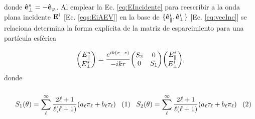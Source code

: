 \documentclass[letterpaper,11pt] {article}
\newcommand{\beqhalf}{\noindent \begin{minipage}[c]{.5\linewidth} \begin{equation}}
\newcommand{\eeqhalf}{\end{equation} \end{minipage} }
\newcommand{\eqhalf}[1]{\beqhalf #1 \eeqhalf}
\begin{document}
donde $\vu{e}_\perp^s=-\vu{e}_\varphi$. Al emplear la Ec. \eqref{eq:EIncidente} para reescribir a la onda plana incidente $\vb{E}^i$ [Ec. \eqref{eqs:EiAEV}] en la base de $\{\vu{e}_\parallel^i,\vu{e}_\perp^i\}$ [Ec. \eqref{eq:vecInc}] se relaciona determina la forma explícita de la matriz de esparcimiento para una partícula esférica\vspace*{-.5em}
	\begin{tcolorbox}[title = Matriz de esparcimiento de Mie,  breakable ]
	\begin{equation}
	\mqty(E_{\parallel}^s\\E_{\perp}^s)  =  
		\frac{e^{ik(r-z)}}{-ikr} \mqty(S_2 & 0\\ 0 & S_1)
	\mqty(E_{\parallel}^i\\E_{\perp}^i),	
	\end{equation}
	donde \begin{subequations}\\
	\eqhalf{	S_1 (\theta) = \sum_\ell^\infty\frac{2\ell+1}{\ell(\ell+1)}(a_\ell\pi_\ell+b_\ell\tau_\ell)
				\label{eqs:S_1}}
	\eqhalf{	S_2 (\theta) = \sum_\ell^\infty\frac{2\ell+1}{\ell(\ell+1)}( a_\ell \tau_\ell + b_\ell\pi_\ell )
			 \label{eqs:S_2}	}
	\label{eq:MatrixElements}	\end{subequations}
	\end{tcolorbox}\vspace*{-.5em}\noindent
\end{document}
